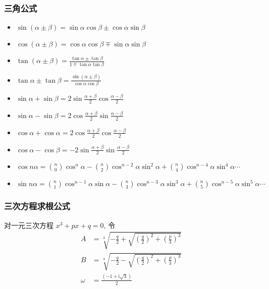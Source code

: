 \documentclass[10pt, a4paper]{article}
\begin{document}
    \subsubsection{三角公式}
    \begin{itemize}
    \item
      $\sin(\alpha \pm \beta) = \sin\alpha\cos\beta \pm \cos\alpha\sin\beta $
    \item
      $\cos(\alpha \pm \beta) = \cos\alpha\cos\beta \mp \sin\alpha\sin\beta $
    \item
      $\tan(\alpha \pm \beta) = \frac{\tan\alpha \pm \tan\beta}{1 \mp \tan\alpha\tan\beta} $
    \item
      $\tan\alpha \pm \tan\beta = \frac{\sin(\alpha \pm \beta)}{\cos\alpha\cos\beta} $
    \item
      $\sin\alpha+\sin\beta = 2\sin\frac{\alpha+\beta}{2}\cos\frac{\alpha-\beta}{2} $
    \item
      $\sin\alpha-\sin\beta = 2\cos\frac{\alpha+\beta}{2}\sin\frac{\alpha-\beta}{2} $
    \item
      $\cos\alpha+\cos\alpha = 2\cos\frac{\alpha+\beta}{2}\cos\frac{\alpha-\beta}{2} $
    \item
      $\cos\alpha-\cos\beta = -2\sin\frac{\alpha+\beta}{2}\sin\frac{\alpha-\beta}{2} $
    \item
      $\cos{n\alpha} =
          \binom{n}{0} \cos ^ {n} \alpha
        - \binom{n}{2} \cos ^ {n - 2} \alpha \sin ^ {2} \alpha
        + \binom{n}{4} \cos ^ {n - 4} \alpha \sin ^ {4} \alpha
      \cdots $
    \item
      $\sin{n\alpha} =
          \binom{n}{1} \cos ^ {n - 1} \alpha \sin \alpha
        - \binom{n}{3} \cos ^ {n - 3} \alpha \sin ^ {3} \alpha
        + \binom{n}{5} \cos ^ {n - 5} \alpha \sin ^ {5} \alpha
        \cdots $
    \end{itemize}
    
    \subsubsection{三次方程求根公式}
      对一元三次方程
      $x ^ 3 + px + q = 0$,
      令
      \begin{align*}
        A &= \sqrt[3]{-\frac{q}{2}+\sqrt{(\frac{q}{2})^2+(\frac{p}{3})^3}} \\
        B &= \sqrt[3]{-\frac{q}{2}-\sqrt{(\frac{q}{2})^2+(\frac{p}{3})^3}} \\ 
        \omega &= \frac{(-1 + \mathrm{i} \sqrt{3})}{2}
      \end{align*}
      
\end{document}
